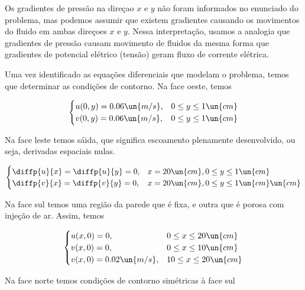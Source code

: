 Os gradientes de pressão na direçao $x$ e $y$
não foram informados no enunciado do problema, mas podemos assumir que existem gradientes 
causando os movimentos do fluido em ambas direçoes $x$ e $y$. Nessa interpretação, usamos a analogia
que gradientes de pressão causam movimento de fluidos da mesma forma que gradientes de potencial
elétrico (tensão) geram fluxo de corrente elétrica. 

Uma vez identificado as equações diferenciais que modelam o problema, temos que determinar
as condições de contorno. Na face oeste, temos

\begin{equation}\label{eq:q4WestBoundary}
    \begin{cases}
        u(0, y) = 0.06 \un{m/s}, & 0 \leq y \leq 1 \un{cm} \\
        v(0, y) = 0.06 \un{m/s}, & 0 \leq y \leq 1 \un{cm} \\
    \end{cases}
\end{equation}

Na face leste temos sáida, que significa escoamento plenamente
desenvolvido, ou seja, derivadas espaciais nulas.

\begin{equation}\label{eq:q4EastBoundary}
    \begin{cases}
        \diffp{u}{x} = \diffp{u}{y} = 0, & x = 20 \un{cm}, 0 \leq y \leq 1 \un{cm}  \\
        \diffp{v}{x} = \diffp{v}{y} = 0, & x = 20 \un{cm}, 0 \leq y \leq 1 \un{cm}  \un{cm}\\
    \end{cases}
\end{equation}

Na face sul temos uma região da parede que é fixa, e outra que é porosa com injeção
de ar. Assim, temos

\begin{equation}\label{eq:q4SouthBoundary}
    \begin{cases}
        u(x, 0) = 0, & 0 \leq x \leq 20 \un{cm}  \\
        v(x, 0) = 0, & 0 \leq x \leq 10 \un{cm}  \\
        v(x, 0) = 0.02 \un{m/s}, & 10 \leq x \leq 20 \un{cm}  \\
    \end{cases}
\end{equation}

Na face norte temos condições de contorno simétricas à face sul

